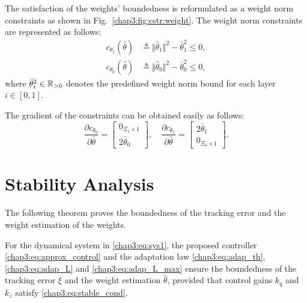 The satisfaction of the weights' boundedness is reformulated as a weight norm constraints as shown in Fig.~\ref{chap3:fig:cstr:weight}.
The weight norm constraints are represented as follows:
\begin{equation}
    \begin{aligned}
        c_{\theta_1}(\hat\theta) &\triangleq \Vert \hat\theta_1\Vert^2 - \bar\theta_1^2 \le 0,\\
        c_{\theta_0}(\hat\theta) &\triangleq \Vert \hat\theta_0\Vert^2 - \bar\theta_0^2 \le 0,
    \end{aligned}
    \label{chap3:eq:cstr:weight}
\end{equation}
where $\bar\theta_i^2\in\mathbb{R}_{>0}$ denotes the predefined weight norm bound for each layer $i\in[0,1]$.

The gradient of the constraints can be obtained easily as follows:
\begin{equation}
  \frac{\partial c_{\theta_0}}{\partial\hat\theta}
  = 
  \begin{bmatrix}
      0_{\Xi_1\times 1} \\
      2\hat\theta_0 
  \end{bmatrix}
  ,\quad
  \frac{\partial c_{\theta_1}}{\partial\hat\theta}    
  = 
  \begin{bmatrix}
      2\hat\theta_1 \\
      0_{\Xi_0\times 1}
  \end{bmatrix}
  .
  \label{chap3:eq:cstr:weight_grad}
\end{equation}

\section{Stability Analysis}

The following theorem proves the boundedness of the tracking error and the weight estimation of the weights.

\begin{theorem}
    For the dynamical system in \eqref{chap3:eq:sys1}, the proposed controller \eqref{chap3:eq:approx_control} and the adaptation law \eqref{chap3:eq:adap_th}, \eqref{chap3:eq:adap_L} and \eqref{chap3:eq:adap_L_max} ensure the boundedness of the tracking error $\xi$ and the weight estimation $\hat\theta$, provided that control gains ${k_q}$ and ${k_z}$ satisfy \eqref{chap3:eq:stable_cond}.
\end{theorem}

